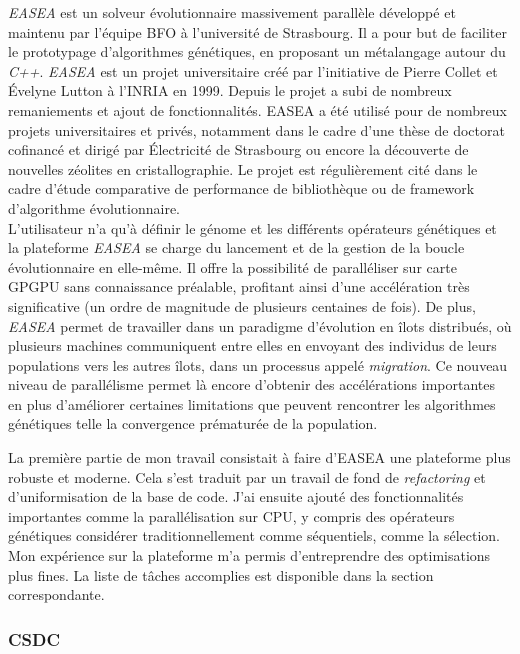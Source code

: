\documentclass[french, 11pt]{memoir}
\begin{document}
\emph{EASEA\cite{collet2000take}} est un solveur évolutionnaire massivement parallèle
développé et maintenu par l'équipe BFO à l'université de Strasbourg. Il
a pour but de faciliter le prototypage d'algorithmes génétiques, en
proposant un métalangage autour du \emph{C++}. \emph{EASEA} est un projet
universitaire créé par l'initiative de Pierre Collet et Évelyne Lutton à
l'INRIA en 1999. Depuis le projet a subi de nombreux remaniements et
ajout de fonctionnalités. EASEA a été utilisé pour de nombreux projets
universitaires et privés, notamment dans le cadre d'une thèse de
doctorat cofinancé et dirigé par Électricité de Strasbourg ou encore la
découverte de nouvelles zéolites en cristallographie\cite{jiang2011synthesis}. Le projet est
régulièrement cité dans le cadre d'étude comparative de performance de
bibliothèque ou de framework d'algorithme évolutionnaire. \\
L'utilisateur
n'a qu'à définir le génome et les différents opérateurs génétiques et la
plateforme \emph{EASEA} se charge du lancement et de la gestion de la
boucle évolutionnaire en elle-même. Il offre la possibilité de
paralléliser sur carte GPGPU sans connaissance préalable, profitant
ainsi d'une accélération très significative (un ordre de magnitude de
plusieurs centaines de fois\cite{maitre2012easea}). De plus, \emph{EASEA} permet de travailler
dans un paradigme d'évolution en îlots distribués, où plusieurs machines
communiquent entre elles en envoyant des individus de leurs populations
vers les autres îlots, dans un processus appelé \emph{migration}. Ce
nouveau niveau de parallélisme permet là encore d'obtenir des
accélérations importantes\cite{whitley1999island} en plus d'améliorer certaines limitations que
peuvent rencontrer les algorithmes génétiques telle la convergence
prématurée de la population.

\bigskip
La première partie de mon travail consistait à faire d'EASEA une
plateforme plus robuste et moderne. Cela s'est traduit par un travail de
fond de \emph{refactoring} et d'uniformisation de la base de code. J'ai
ensuite ajouté des fonctionnalités importantes comme la parallélisation
sur CPU, y compris des opérateurs génétiques considérer
traditionnellement comme séquentiels, comme la sélection. Mon expérience
sur la plateforme m'a permis d'entreprendre des optimisations plus
fines. La liste de tâches accomplies est disponible dans la section
correspondante.

\subsubsection{CSDC}\label{csdc}
\end{document}
